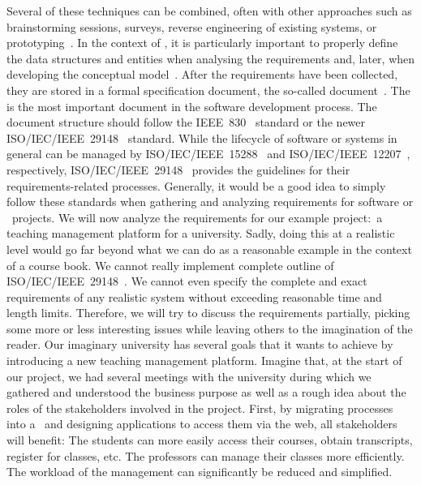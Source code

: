 Several of these techniques can be combined, often with other approaches such as brainstorming sessions, surveys, reverse engineering of existing systems, or prototyping~\cite{I2018SAH,Z2003RDARS}.
In the context of , it is particularly important to properly define the data structures and entities when analysing the requirements and, later, when developing the conceptual model~\cite{M1987DFADSMFDRACS}.%
%
\endhsection%
%
%
After the requirements have been collected, they are stored in a formal specification document, the so-called  document~\cite{S2010DSRSAR,W2004ASOTMFMTQOTRSD}.
The  is the most important document in the software development process.
The document structure should follow the IEEE~830~\cite{IEEE1998IRPFSRS} standard or the newer ISO/IEC/IEEE~29148~\cite{ISOIECIEEE2018SASELCPRE} standard.
While the lifecycle of software or systems in general can be managed by ISO/IEC/IEEE~15288~\cite{ISOIECIEEE2023SASESLCP} and ISO/IEC/IEEE~12207~\cite{ISOIECIEEE2017SASESLCP}, respectively, ISO/IEC/IEEE~29148~\cite{ISOIECIEEE2018SASELCPRE} provides the guidelines for their requirements-related processes.
Generally, it would be a good idea to simply follow these standards when gathering and analyzing requirements for software or \db\ projects.%
\endhsection%
%
%
%
We will now analyze the requirements for our example project:~a teaching management platform for a university.
Sadly, doing this at a realistic level would go far beyond what we can do as a reasonable example in the context of a course book.
We cannot really implement complete outline of ISO/IEC/IEEE~29148~\cite{ISOIECIEEE2018SASELCPRE}.
We cannot even specify the complete and exact requirements of any realistic system without exceeding reasonable time and length limits.
Therefore, we will try to discuss the requirements partially, picking some more or less interesting issues while leaving others to the imagination of the reader.%
%
%
%
Our imaginary university has several goals that it wants to achieve by introducing a new teaching management platform.
Imagine that, at the start of our project, we had several meetings with the university during which we gathered and understood the business purpose as well as a rough idea about the roles of the stakeholders involved in the project.
%
%
First, by migrating processes into a \db\ and designing applications to access them via the web, all stakeholders will benefit:
The students can more easily access their courses, obtain transcripts, register for classes, etc.
The professors can manage their classes more efficiently.
The workload of the management can significantly be reduced and simplified.

